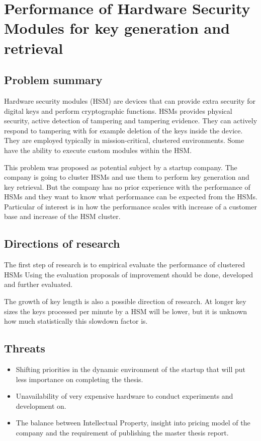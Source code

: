 \section{Performance of Hardware Security Modules for key generation and retrieval}

\subsection{Problem summary}
Hardware security modules (HSM) are devices that can provide extra security for digital keys and perform cryptographic functions.
HSMs provides physical security, active detection of tampering and tampering evidence. 
They can actively respond to tampering with for example deletion of the keys inside the device.
They are employed typically in mission-critical, clustered environments.
Some have the ability to execute custom modules within the HSM.

This problem was proposed as potential subject by a startup company.
The company is going to cluster HSMs and use them to perform key generation and key retrieval.
But the company has no prior experience with the performance of HSMs
and they want to know what performance can be expected from the HSMs.
Particular of interest is in how the performance scales with increase of a customer base and increase of the HSM cluster.

\subsection{Directions of research}
The first step of research is to empirical evaluate the performance of clustered HSMs 
Using the evaluation proposals of improvement should be done, developed and further evaluated.

The growth of key length is also a possible direction of research. 
At longer key sizes the keys processed per minute by a HSM will be lower,
but it is unknown how much statistically this slowdown factor is. 

\subsection{Threats}
\begin{itemize}
\item Shifting priorities in the dynamic environment of the startup that will put less importance on completing the thesis.
\item Unavailability of very expensive hardware to conduct experiments and development on.
\item The balance between Intellectual Property, insight into pricing model of the company and the requirement of publishing the master thesis report.
\end{itemize}

